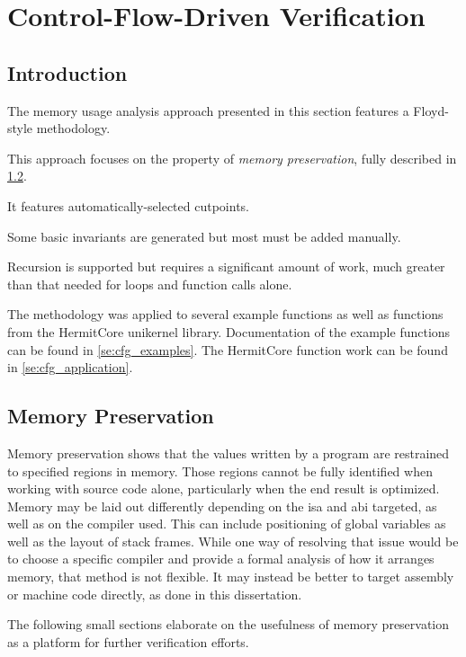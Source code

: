 \chapter{Control-Flow-Driven Verification}

\section{Introduction}\label{se:cfg_intro}
The memory usage analysis approach presented in this section features a Floyd-style methodology.

This approach focuses on the property of \emph{memory preservation},
fully described in \cref{se:memory_preservation}.

It features automatically-selected cutpoints.

Some basic invariants are generated but most must be added manually.

Recursion is supported but requires a significant amount of work,
much greater than that needed for loops and function calls alone.

The methodology was applied to several example functions
as well as functions from the HermitCore unikernel library.
Documentation of the example functions can be found in \cref{se:cfg_examples}.
The HermitCore function work can be found in \cref{se:cfg_application}.

\section{Memory Preservation}\label{se:memory_preservation}
Memory preservation shows that the values written by a program
are restrained to specified regions in memory.
Those regions cannot be fully identified when working with source code alone,
particularly when the end result is optimized.
Memory may be laid out differently depending on the \ac{isa} and \ac{abi} targeted,
as well as on the compiler used.
This can include positioning of global variables as well as the layout of stack frames.
While one way of resolving that issue would be to choose a specific compiler
and provide a formal analysis of how it arranges memory, that method is not flexible.
It may instead be better to target assembly or machine code directly,
as done in this dissertation.

The following small sections elaborate on the usefulness of memory preservation
as a platform for further verification efforts.

